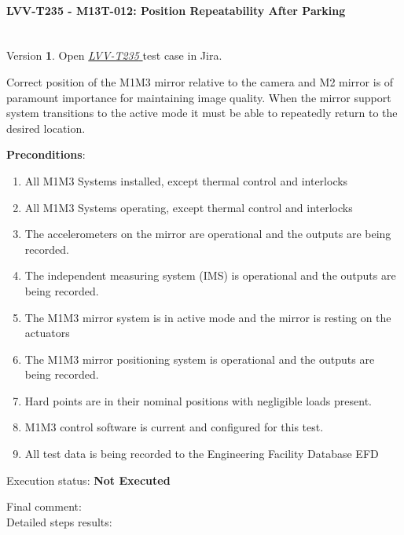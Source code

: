 \documentclass[SE,lsstdraft,STR,toc]{lsstdoc}
\providecommand{\tightlist}{
  \setlength{\itemsep}{0pt}\setlength{\parskip}{0pt}}
\begin{document}
\paragraph{ LVV-T235 - M13T-012: Position Repeatability After Parking }\mbox{}\\

Version \textbf{1}.
Open  \href{https://jira.lsstcorp.org/secure/Tests.jspa#/testCase/LVV-T235}{\textit{ LVV-T235 } }
test case in Jira.

Correct position of the M1M3 mirror relative to the camera and M2 mirror
is of paramount importance for maintaining image quality. When the
mirror support system transitions to the active mode it must be able to
repeatedly return to the desired location.

\textbf{ Preconditions}:\\
\begin{enumerate}
\tightlist
\item
  All M1M3 Systems installed, except thermal control and interlocks
\item
  All M1M3 Systems operating, except thermal control and interlocks
\item
  The accelerometers on the mirror are operational and the outputs are
  being recorded.
\item
  The independent measuring system (IMS) is operational and the outputs
  are being recorded.
\item
  The M1M3 mirror system is in active mode and the mirror is resting on
  the actuators
\item
  The M1M3 mirror positioning system is operational and the outputs are
  being recorded.
\item
  Hard points are in their nominal positions with negligible loads
  present.
\item
  M1M3 control software is current and configured for this test.
\item
  All test data is being recorded to the Engineering Facility Database
  EFD
\end{enumerate}

Execution status: {\bf Not Executed }

Final comment:\\


Detailed steps results:
\end{document}
